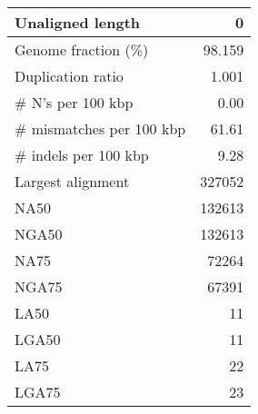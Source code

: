 \documentclass[12pt,a4paper]{article}
\begin{document}
\begin{table}[ht]
\begin{center}
\begin{tabular}{|l*{1}{|r}|}
Unaligned length & 0 \\ \hline
Genome fraction (\%) & 98.159 \\ \hline
Duplication ratio & 1.001 \\ \hline
\# N's per 100 kbp & 0.00 \\ \hline
\# mismatches per 100 kbp & 61.61 \\ \hline
\# indels per 100 kbp & 9.28 \\ \hline
Largest alignment & 327052 \\ \hline
NA50 & 132613 \\ \hline
NGA50 & 132613 \\ \hline
NA75 & 72264 \\ \hline
NGA75 & 67391 \\ \hline
LA50 & 11 \\ \hline
LGA50 & 11 \\ \hline
LA75 & 22 \\ \hline
LGA75 & 23 \\ \hline
\end{tabular}
\end{center}
\end{table}
\end{document}
